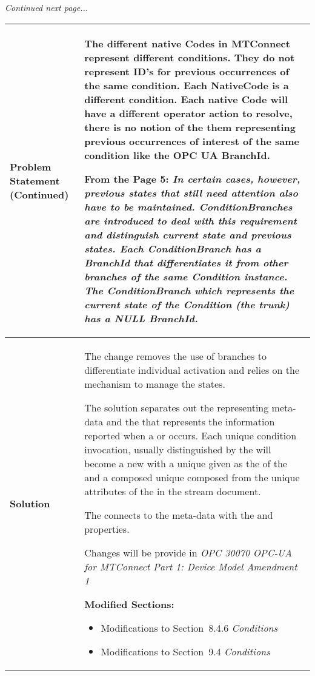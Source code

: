 \documentclass{mtc-opc}	%
\begin{document}
\textit{Continued next page...}

\begin{table}[ht]
  \centering 
  \tabulinesep=6pt
  \begin{tabu} to 6in {|X[0.4]|X|} \everyrow{\hline}
    \hline
    \bfseries {Problem Statement
      (Continued)} & \small{
      The different native Codes in MTConnect represent different conditions. They do not represent ID's for previous occurrences of the same condition. Each NativeCode is a different condition. Each native Code will have a different operator action to resolve, there is no notion of the them representing previous occurrences of interest of the same condition like the OPC UA BranchId.

      \vspace{6pt}
      From the \cite{UAPart9} Page 5:
      \textit{In certain cases, however, previous states that still need attention also have to be maintained. ConditionBranches are introduced to deal with this requirement and distinguish current state and previous states. Each ConditionBranch has a BranchId that differentiates it from other branches of the same Condition instance. The ConditionBranch which represents the current state of the Condition (the trunk) has a NULL BranchId.}
     } \\
    \hline
    \bfseries {Solution} &
    {
      The change removes the use of branches to differentiate individual  activation and relies on the   mechanism to manage the  states.
      \vspace{6pt}
      
      The solution separates out the  representing meta-data and the  that represents the information reported when a  or  occurs. Each unique condition invocation, usually distinguished by the  will become a new  with a unique  given as the  of the  and a composed unique  composed from the unique attributes of the  in the stream document.

      \vspace{6pt}
      The  connects to the  meta-data  with the  and  properties.

      Changes will be provide in \textit{OPC 30070 OPC-UA for MTConnect Part 1: Device Model Amendment 1}
      
      \vspace{12pt}
      \textbf{Modified Sections:}
      \begin{itemize}
        \item Modifications to Section~8.4.6 \textit{Conditions}
        \item Modifications to Section~9.4 \textit{Conditions}
      \end{itemize}
    }\\
  \end{tabu}
\end{table}
\end{document}

